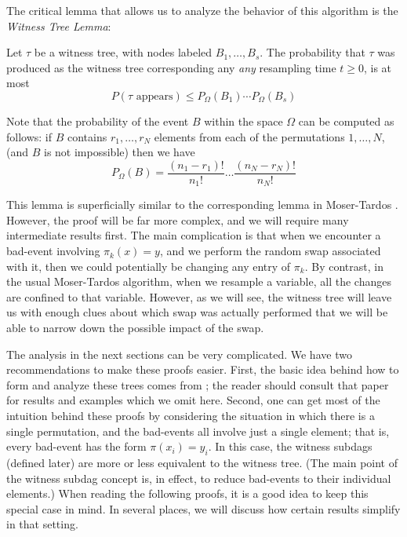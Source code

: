 The critical lemma that allows us to analyze the behavior of this algorithm is the \emph{Witness Tree Lemma}: 
\begin{lemma}
\label{witness-tree-lemma}
Let $\tau$ be a witness tree, with nodes labeled $B_1, \dots, B_s$. The probability that $\tau$ was produced as the witness tree corresponding any \emph{any} resampling time $t \geq 0$, is at most
$$
P(\text{$\tau$ appears}) \leq P_{\Omega}(B_1) \cdots P_{\Omega}(B_s)
$$

Note that the probability of the event $B$ within the space $\Omega$ can be computed as follows: if $B$ contains $r_1, \dots, r_N$ elements from each of the permutations $1, \dots, N$, (and $B$ is not impossible) then we have $$
P_{\Omega}(B) = \frac{(n_1-r_1)!}{n_1!} \dots \frac{ (n_N - r_N)! }{n_N!}
$$
\end{lemma}
This lemma is superficially similar to the corresponding lemma in Moser-Tardos \cite{moser-tardos}. However, the proof will be far more complex, and we will require many intermediate results first. The main complication is that when we encounter a bad-event involving $\pi_k(x) = y$, and we perform the random swap associated with it, then we could potentially be changing any entry of $\pi_k$. By contrast, in the usual Moser-Tardos algorithm, when we resample a variable, all the changes are confined to that variable. However, as we will see, the witness tree will leave us with enough clues about which swap was actually performed that we will be able to narrow down the possible impact of the swap.

The analysis in the next sections can be very complicated. We have two recommendations to make these proofs easier. First, the basic idea behind how to form and analyze these trees comes from \cite{moser-tardos}; the reader should consult that paper for results and examples which we omit here. Second, one can get most of the intuition behind these proofs by considering the situation in which there is a single permutation, and the bad-events all involve just a single element; that is, every bad-event has the form $\pi(x_i) = y_i$. In this case, the witness subdags (defined later) are more or less equivalent to the witness tree. (The main point of the witness subdag concept is, in effect, to reduce bad-events to their individual elements.) When reading the following proofs, it is a good idea to keep this special case in mind. In several places, we will discuss how certain results simplify in that setting.

